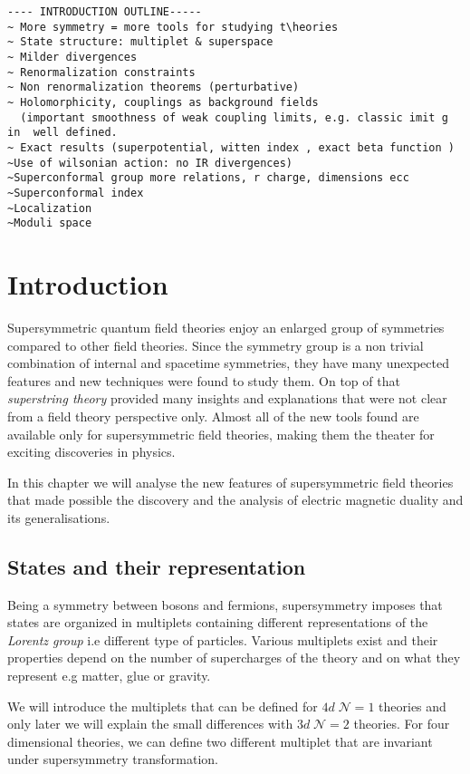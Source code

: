 \begin{lstlisting}
---- INTRODUCTION OUTLINE-----
~ More symmetry = more tools for studying t\heories
~ State structure: multiplet & superspace
~ Milder divergences 
~ Renormalization constraints
~ Non renormalization theorems (perturbative)
~ Holomorphicity, couplings as background fields 
  (important smoothness of weak coupling limits, e.g. classic imit g in  well defined.
~ Exact results (superpotential, witten index , exact beta function )
~Use of wilsonian action: no IR divergences)
~Superconformal group more relations, r charge, dimensions ecc
~Superconformal index
~Localization
~Moduli space
\end{lstlisting}

\section{Introduction}
Supersymmetric quantum field theories enjoy an enlarged group of  symmetries compared to other field theories. 
Since the symmetry group is a non trivial combination of internal and spacetime symmetries, they have many unexpected features and new techniques were found to study them.
On top of that \emph{superstring theory} provided many insights and explanations that were not clear from a field theory perspective only. 
Almost all of the new tools found are available only for supersymmetric field theories, making them the theater for exciting discoveries in physics.

In this chapter we will analyse the new features of supersymmetric field theories that made possible the discovery and the analysis of electric magnetic duality and its generalisations.

\subsection{ States and their representation}

Being a symmetry between bosons and fermions, supersymmetry imposes that states are organized in multiplets containing different representations of the \emph{Lorentz group} i.e different type of  particles.
Various multiplets exist and their properties depend on the number of supercharges of the theory and on what they represent e.g matter, glue or gravity. 

We will introduce the multiplets that can be defined for $4d \; \mathcal{N} = 1$ theories and only later we will explain the small differences with $3d \; \mathcal{N} = 2$ theories.
For four dimensional theories, we can define two different multiplet that are invariant under supersymmetry transformation.

